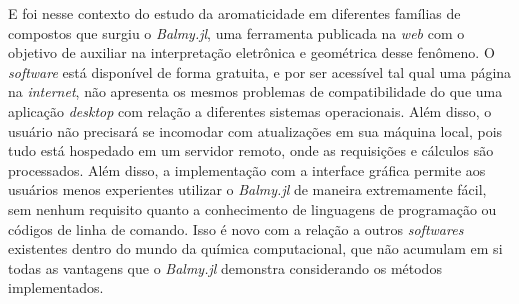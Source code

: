 E foi nesse contexto do estudo da aromaticidade em diferentes famílias de compostos que surgiu o \textit{Balmy.jl}, uma ferramenta publicada na \textit{web} com o objetivo de auxiliar na interpretação eletrônica e geométrica desse fenômeno. O \textit{software} está disponível de forma gratuita, e por ser acessível tal qual uma página na \textit{internet}, não apresenta os mesmos problemas de compatibilidade do que uma aplicação \textit{desktop} com relação a diferentes sistemas operacionais. Além disso, o usuário não precisará se incomodar com atualizações em sua máquina local, pois tudo está hospedado em um servidor remoto, onde as requisições e cálculos são processados. Além disso, a implementação com a interface gráfica permite aos usuários menos experientes utilizar o \textit{Balmy.jl} de maneira extremamente fácil, sem nenhum requisito quanto a conhecimento de linguagens de programação ou códigos de linha de comando. Isso é novo com a relação a outros \textit{softwares} existentes dentro do mundo da química computacional, que não acumulam em si todas as vantagens que o \textit{Balmy.jl} demonstra considerando os métodos implementados.